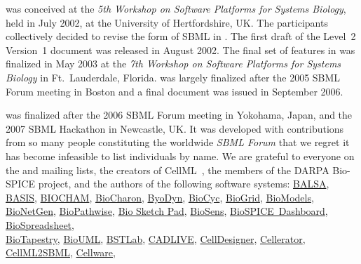 \sbmltwo was conceived at the \emph{5th Workshop on Software
  Platforms for Systems Biology}, held in July 2002, at the
University of Hertfordshire, UK.  The participants collectively
decided to revise the form of SBML in \sbmltwo.  The first draft
of the Level~2 Version~1 document was released in August 2002. The
final set of features in \sbmltwoone was finalized in May 2003 at
the \emph{7th Workshop on Software Platforms for Systems Biology}
in Ft.\ Lauderdale, Florida.  \sbmltwotwo was largely finalized
after the 2005 SBML Forum meeting in Boston and a final document
was issued in September 2006.

\sbmltwothree was finalized after the 2006 SBML Forum
  meeting in Yokohama, Japan, and the 2007  SBML
  Hackathon in Newcastle, UK.  It was developed with
contributions from so many people constituting the worldwide
\emph{SBML Forum} that we regret it has become infeasible to list
individuals by name.  We are grateful to everyone on the
 and
 mailing
lists, the creators of CellML~\citep{hedley:2001b}, the members of
the DARPA Bio-SPICE project, and the authors of the following
software systems:
\href{http://depts.washington.edu/ventures/UW_Technology/Emerging_Technologies/CSI.php}{BALSA},
\href{http://www.basis.ncl.ac.uk}{BASIS},
\href{http://contraintes.inria.fr/BIOCHAM/}{BIOCHAM},
\href{http://www.cis.upenn.edu/biocomp}{BioCharon},
\href{http://diana.imim.es/ByoDyn}{ByoDyn},
\href{http://www.biocyc.org}{BioCyc},
\href{http://biocomp.ece.utk.edu/tools.html}{BioGrid},
\href{http://www.biomodels.net}{BioModels},
\href{http://cellsignaling.lanl.gov/bionetgen}{BioNetGen},
\href{http://www.bioanalyticsgroup.com/}{BioPathwise},
\href{http://www.cis.upenn.edu/biocomp/new_html/biosketch.php3}{Bio
  Sketch Pad},
\href{http://www.chemengr.ucsb.edu/~ceweb/faculty/doyle/biosens/BioSens.htm}{BioSens},
\href{http://www.biospice.org}{BioSPICE~Dashboard},
\href{http://biocomp.ece.utk.edu/tools.html}{\mbox{BioSpreadsheet}},\\
\href{http://labs.systemsbiology.net/bolouri/software/BioTapestry/}{BioTapestry},
\href{http://www.biouml.org/}{BioUML},
\href{https://bioinformatics.musc.edu/bstlab/}{BSTLab},
\href{http://kurata21.bse.kyutech.ac.jp/cadlive/}{CADLIVE},
\href{http://celldesigner.org}{CellDesigner},
\href{http://www-aig.jpl.nasa.gov/public/mls/cellerator/}{Cellerator},
\href{http://sbml.org/software/cellml2sbml/}{CellML2SBML},
\href{http://www.bii.a-star.edu.sg/sbg/cellware}{\mbox{Cellware}},
